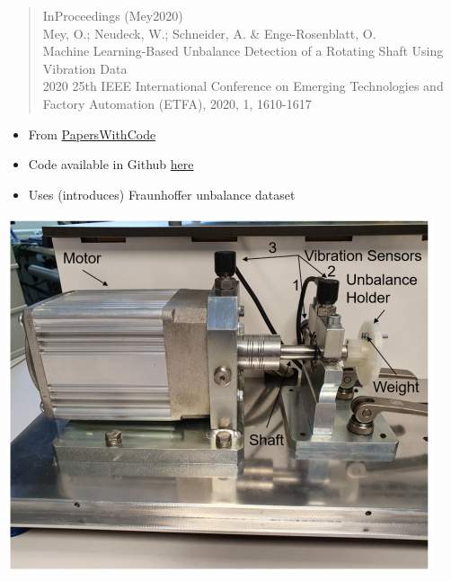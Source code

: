 \documentclass[
  letterpaper,
  DIV=11,
  numbers=noendperiod]{scrartcl}
\providecommand{\tightlist}{%
  \setlength{\itemsep}{0pt}\setlength{\parskip}{0pt}}\usepackage{longtable,booktabs,array}
\begin{document}
\begin{quote}
InProceedings (Mey2020)\\
Mey, O.; Neudeck, W.; Schneider, A. \& Enge-Rosenblatt, O.\\
Machine Learning-Based Unbalance Detection of a Rotating Shaft Using
Vibration Data\\
2020 25th IEEE International Conference on Emerging Technologies and
Factory Automation (ETFA), 2020, 1, 1610-1617
\end{quote}

\begin{itemize}
\tightlist
\item
  From
  \href{https://paperswithcode.com/paper/machine-learning-based-unbalance-detection-of}{PapersWithCode}
\item
  Code available in Github
  \href{https://github.com/deepinsights-analytica/ieee-etfa2020-paper}{here}
\item
  Uses (introduces) Fraunhoffer unbalance dataset
\end{itemize}

\includegraphics{img/2023-01-29-17-20-58.png}
\end{document}

